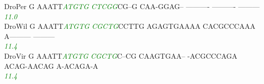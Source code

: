 \documentclass[11pt,twoside,reqno,a4paper]{article}
\begin{document}
{DroPer	G	AAATT\textit{\textcolor{Green}{A}}\textit{\textcolor{Green}{T}}\textit{\textcolor{Green}{G}}\textit{\textcolor{Green}{T}}\textit{\textcolor{Green}{G}}	\textit{\textcolor{Green}{C}}\textit{\textcolor{Green}{T}}\textit{\textcolor{Green}{C}}\textit{\textcolor{Green}{G}}\textit{\textcolor{Green}{G}}CG--G	CAA-GGAG--	----------	----------	---------\\
\hspace*{7\charwidth}\hspace*{1\charwidth}\hspace*{6\charwidth}\textit{\textcolor{Green}{11.0}}\hspace*{1\charwidth}\hspace*{1\charwidth}\hspace*{1\charwidth}\hspace*{1\charwidth}\hspace*{1\charwidth}\\
DroWil	G	AAATT\textit{\textcolor{Green}{A}}\textit{\textcolor{Green}{T}}\textit{\textcolor{Green}{G}}\textit{\textcolor{Green}{T}}\textit{\textcolor{Green}{G}}	\textit{\textcolor{Green}{C}}\textit{\textcolor{Green}{G}}\textit{\textcolor{Green}{C}}\textit{\textcolor{Green}{T}}\textit{\textcolor{Green}{G}}CCTTG	AGAGTGAAAA	CACGCCCAAA	A---------	---------\\
\hspace*{7\charwidth}\hspace*{1\charwidth}\hspace*{6\charwidth}\textit{\textcolor{Green}{11.4}}\hspace*{1\charwidth}\hspace*{1\charwidth}\hspace*{1\charwidth}\hspace*{1\charwidth}\hspace*{1\charwidth}\\
DroVir	G	AAATT\textit{\textcolor{Green}{A}}\textit{\textcolor{Green}{T}}\textit{\textcolor{Green}{G}}\textit{\textcolor{Green}{T}}\textit{\textcolor{Green}{G}}	\textit{\textcolor{Green}{C}}\textit{\textcolor{Green}{G}}\textit{\textcolor{Green}{C}}\textit{\textcolor{Green}{T}}\textit{\textcolor{Green}{G}}C--CG	CAAGTGAA--	-ACGCCCAGA	ACAG-AACAG	A-ACAGA-A\\
\hspace*{7\charwidth}\hspace*{1\charwidth}\hspace*{6\charwidth}\textit{\textcolor{Green}{11.4}}\hspace*{1\charwidth}\hspace*{1\charwidth}\hspace*{1\charwidth}\hspace*{1\charwidth}\hspace*{1\charwidth}\\
}
\end{document}
